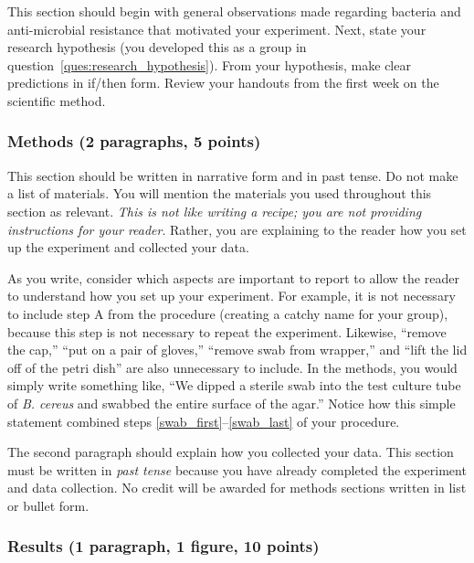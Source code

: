 \documentclass[12pt]{exam}
\begin{document}
This section should begin with general observations made regarding
bacteria and anti-microbial resistance that motivated your experiment.
Next, state your research hypothesis (you developed this as a group in question~\ref{ques:research_hypothesis}).
From your hypothesis, make clear predictions in if/then form. Review your handouts from
the first week on the scientific method.

\subsubsection*{Methods (2 paragraphs, 5 points)} 

This section should be written in narrative form and in past tense. Do
not make a list of materials. You will mention the materials you used
throughout this section as relevant. \emph{This is not like writing a
recipe; you are not providing instructions for your reader}. Rather, you
are explaining to the reader how you set up the experiment and collected
your data.

As you write, consider which aspects are important to report to allow
the reader to understand how you set up your experiment. For example, it
is not necessary to include step A from the procedure (creating a catchy
name for your group), because this step is not necessary to repeat the
experiment. Likewise, ``remove the cap,'' ``put on a pair of
gloves,'' ``remove swab from wrapper,'' and ``lift the lid off of the petri
dish'' are also unnecessary to include. In the methods, you would simply
write something like, ``We dipped a sterile swab into the test culture
tube of \emph{B. cereus} and swabbed the entire surface of the agar.''
Notice how this simple statement combined steps \ref{swab_first}–\ref{swab_last} of your procedure.

The second paragraph should explain how you
collected your data. This section must be written in \emph{past tense} because you have
already completed the experiment and data collection. No credit will be
awarded for methods sections written in list or bullet form.

\subsubsection*{Results (1 paragraph, 1 figure, 10 points)}

\end{document}
